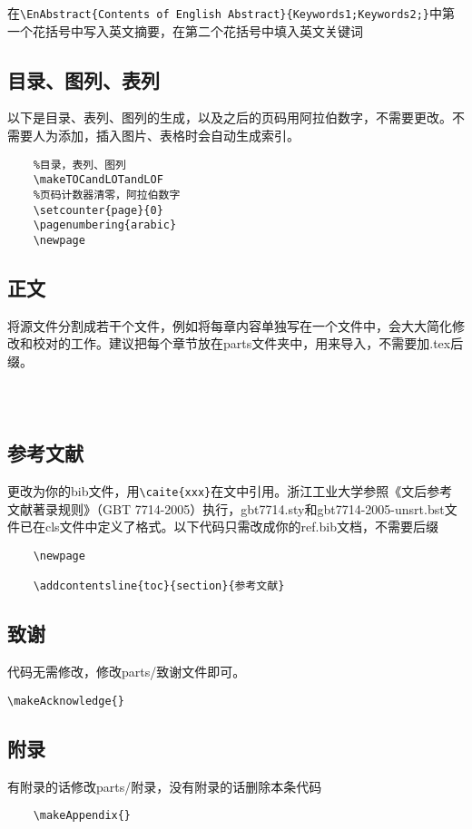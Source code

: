在\verb|\EnAbstract{Contents of English Abstract}{Keywords1;Keywords2;}|中第一个花括号中写入英文摘要，在第二个花括号中填入英文关键词


\subsection{目录、图列、表列}

以下是目录、表列、图列的生成，以及之后的页码用阿拉伯数字，不需要更改。不需要人为添加，插入图片、表格时会自动生成索引。

\begin{lstlisting}
	%目录，表列、图列
	\makeTOCandLOTandLOF
	%页码计数器清零，阿拉伯数字
	\setcounter{page}{0}
	\pagenumbering{arabic}
	\newpage
\end{lstlisting}

\subsection{正文}

将源文件分割成若干个文件，例如将每章内容单独写在一个文件中，会大大简化修改和校对的工作。建议把每个章节放在parts文件夹中，用\verb||来导入，不需要加.tex后缀。

\begin{lstlisting}
	
	
\end{lstlisting}

\subsection{参考文献}

\verb||更改为你的bib文件，用\verb|\caite{xxx}|在文中引用。浙江工业大学参照《文后参考文献著录规则》（GBT 7714-2005）执行，gbt7714.sty和gbt7714-2005-unsrt.bst文件已在cls文件中定义了格式。以下代码只需改成你的ref.bib文档，不需要后缀

\begin{lstlisting}
	\newpage
	
	\addcontentsline{toc}{section}{参考文献}
\end{lstlisting}

\subsection{致谢}

代码无需修改，修改parts/致谢文件即可。

\begin{lstlisting}
\makeAcknowledge{}
\end{lstlisting}

\subsection{附录}

有附录的话修改parts/附录，没有附录的话删除本条代码

\begin{lstlisting}
	\makeAppendix{}
\end{lstlisting}

\newpage